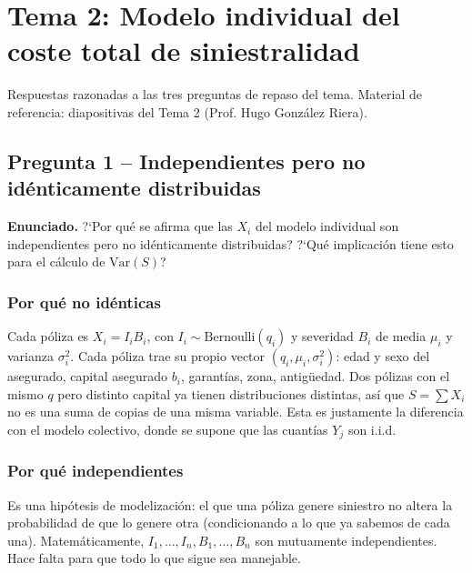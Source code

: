 \documentclass[a4paper,12pt]{article}
\newcommand{\Var}{\mathrm{Var}}
\begin{document}
\restoregeometry
\newpage
{}
\setcounter{page}{1}

\section{Tema 2: Modelo individual del coste total de siniestralidad}
\label{sec:tema2repaso}
\noindent
Respuestas razonadas a las tres preguntas de repaso del tema. Material de referencia: diapositivas del Tema 2 (Prof. Hugo González Riera).

\subsection{Pregunta 1 -- Independientes pero no id\'enticamente distribuidas}

\noindent\textbf{Enunciado.} ?`Por qu\'e se afirma que las $X_i$ del modelo individual son independientes pero no id\'enticamente distribuidas? ?`Qu\'e implicaci\'on tiene esto para el c\'alculo de $\Var(S)$?

\subsubsection*{Por qu\'e no id\'enticas}
Cada p\'oliza es $X_i=I_iB_i$, con $I_i\sim\text{Bernoulli}(q_i)$ y severidad $B_i$ de media $\mu_i$ y varianza $\sigma_i^2$. Cada p\'oliza trae su propio vector $(q_i,\mu_i,\sigma_i^2)$: edad y sexo del asegurado, capital asegurado $b_i$, garant\'ias, zona, antig\"uedad. Dos p\'olizas con el mismo $q$ pero distinto capital ya tienen distribuciones distintas, as\'i que $S=\sum X_i$ no es una suma de copias de una misma variable. Esta es justamente la diferencia con el modelo colectivo, donde se supone que las cuant\'ias $Y_j$ son i.i.d.

\subsubsection*{Por qu\'e independientes}
Es una hip\'otesis de modelizaci\'on: el que una p\'oliza genere siniestro no altera la probabilidad de que lo genere otra (condicionando a lo que ya sabemos de cada una). Matem\'aticamente, $I_1,\dots,I_n,B_1,\dots,B_n$ son mutuamente independientes. Hace falta para que todo lo que sigue sea manejable.
\end{document}
